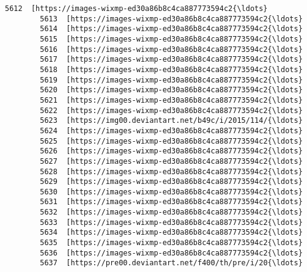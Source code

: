 \documentclass[11pt]{article}
\begin{document}
\begin{Verbatim}[commandchars=\\\{\}]
        5612  [https://images-wixmp-ed30a86b8c4ca887773594c2{\ldots}   
        5613  [https://images-wixmp-ed30a86b8c4ca887773594c2{\ldots}   
        5614  [https://images-wixmp-ed30a86b8c4ca887773594c2{\ldots}   
        5615  [https://images-wixmp-ed30a86b8c4ca887773594c2{\ldots}   
        5616  [https://images-wixmp-ed30a86b8c4ca887773594c2{\ldots}   
        5617  [https://images-wixmp-ed30a86b8c4ca887773594c2{\ldots}   
        5618  [https://images-wixmp-ed30a86b8c4ca887773594c2{\ldots}   
        5619  [https://images-wixmp-ed30a86b8c4ca887773594c2{\ldots}   
        5620  [https://images-wixmp-ed30a86b8c4ca887773594c2{\ldots}   
        5621  [https://images-wixmp-ed30a86b8c4ca887773594c2{\ldots}   
        5622  [https://images-wixmp-ed30a86b8c4ca887773594c2{\ldots}   
        5623  [https://img00.deviantart.net/b49c/i/2015/114/{\ldots}   
        5624  [https://images-wixmp-ed30a86b8c4ca887773594c2{\ldots}   
        5625  [https://images-wixmp-ed30a86b8c4ca887773594c2{\ldots}   
        5626  [https://images-wixmp-ed30a86b8c4ca887773594c2{\ldots}   
        5627  [https://images-wixmp-ed30a86b8c4ca887773594c2{\ldots}   
        5628  [https://images-wixmp-ed30a86b8c4ca887773594c2{\ldots}   
        5629  [https://images-wixmp-ed30a86b8c4ca887773594c2{\ldots}   
        5630  [https://images-wixmp-ed30a86b8c4ca887773594c2{\ldots}   
        5631  [https://images-wixmp-ed30a86b8c4ca887773594c2{\ldots}   
        5632  [https://images-wixmp-ed30a86b8c4ca887773594c2{\ldots}   
        5633  [https://images-wixmp-ed30a86b8c4ca887773594c2{\ldots}   
        5634  [https://images-wixmp-ed30a86b8c4ca887773594c2{\ldots}   
        5635  [https://images-wixmp-ed30a86b8c4ca887773594c2{\ldots}   
        5636  [https://images-wixmp-ed30a86b8c4ca887773594c2{\ldots}   
        5637  [https://pre00.deviantart.net/f400/th/pre/i/20{\ldots}   
        

\end{Verbatim}
\end{document}
